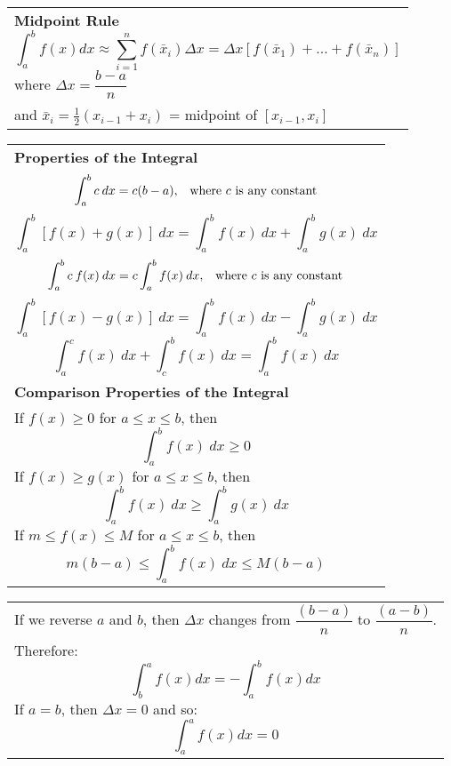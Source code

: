 \documentclass[fleqn]{article}
\begin{document}
\begin{center}
\def\arraystretch{1.3}
{\setlength{\tabcolsep}{16pt}
\begin{tabularx}{.9\textwidth}{|X|}
\hline
	\vspace{1pt}
	\textbf{Midpoint Rule}
	$$ \int_a^b f(x) dx \approx \sum_{i=1}^n f(\bar x_i) \Delta x = \Delta x [f(\bar x_1) + ... + f(\bar x_n)] $$ 
	where \hspace{16pt} $\Delta x = \dfrac{b-a}{n}$ \\[12pt]
	and \hspace{30pt} $\bar x_i = \frac{1}{2} (x_{i-1} + x_i)$ \hspace{5pt} = \hspace{5pt} midpoint of \hspace{5pt} $[x_{i-1}, x_i]$ \\[12pt]
\hline
\end{tabularx}}
\vspace{12pt}

\def\arraystretch{1.3}
{\setlength{\tabcolsep}{16pt}
\begin{tabularx}{.9\textwidth}{|X|}
\hline
	\vspace{1pt}
	\textbf{Properties of the Integral}
	\[\int_a^b c \: dx = c(b-a), \text{\hspace{5pt} where $c$ is any constant}\]
	\[\int_a^b [f(x) + g(x)] \: dx = \int_a^b f(x) \: dx + \int_a^b g(x) \: dx\]
	\[\int_a^b c \: f(x) \: dx = c \int_a^b f(x) \: dx, \text{\hspace{5pt} where $c$ is any constant}\]
	\[\int_a^b [f(x) - g(x)] \: dx = \int_a^b f(x) \: dx - \int_a^b g(x) \: dx\]
	\[\int_a^c f(x) \: dx + \int_c^b f(x) \: dx = \int_a^b f(x) \: dx\]\\
	\textbf{Comparison Properties of the Integral} \\[10pt]
	If $f(x) \geq 0$ for $a \leq x \leq b$, then \[\int_a^b f(x) \: dx \geq 0\]
	If $f(x) \geq g(x)$ for $a \leq x \leq b$, then \[\int_a^b f(x) \: dx \geq \int_a^b g(x) \: dx\]
	If $m \leq f(x) \leq M$ for $a \leq x \leq b$, then \[m(b-a) \leq \int_a^b f(x) \: dx \leq M(b-a)\] \\
\hline
\end{tabularx}}
\vspace{12pt}

\def\arraystretch{1.3}
{\setlength{\tabcolsep}{16pt}
\begin{tabularx}{.9\textwidth}{|X|}
\hline
	\vspace{1pt}
	If we reverse $a$ and $b$, then $\Delta x$ changes from $\dfrac{(b-a)}{n}$ to $\dfrac{(a-b)}{n}$. \\ 		Therefore:
	$$ \int_b^a f(x) dx = - \int_a^b f(x) dx $$
	If \hspace{5pt} $a=b$, \hspace{5pt} then \hspace{5pt} $\Delta x = 0$ \hspace{5pt} and so: 
	$$ \int_a^a f(x) dx = 0 $$ \\
\hline
\end{tabularx}}
\vspace{12pt}


\end{center}
\end{document}
